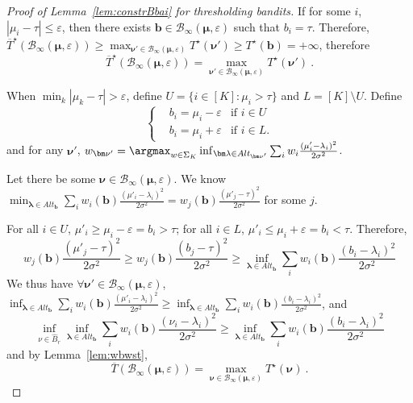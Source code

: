 \begin{proof}[Proof of Lemma~\ref{lem:constrBbai} for thresholding bandits]
	If for some $i$, $|\mu_i -\tau|\leq \varepsilon$, then there exists $\bm b\in \mathcal{B}_\infty(\bm\mu,\varepsilon)$ such that $b_i = \tau$. Therefore, $\overline{T}^\star(\mathcal{B}_\infty(\bm\mu,\varepsilon)) \geq \max_{\bm\nu'\in \mathcal{B}_\infty(\bm\mu,\varepsilon)} T^\star(\bm\nu')\geq T^\star(\bm b) =+\infty$, therefore \[\overline{T}^\star(\mathcal{B}_\infty(\bm\mu,\varepsilon)) = \max_{\bm\nu'\in \mathcal{B}_\infty(\bm\mu,\varepsilon)}T^\star(\bm\nu') \: .\]
	
	When $\min_k |\mu_k-\tau|>\varepsilon$, define $U=\{i\in[K]:\mu_i >\tau\}$ and $L=[K]\setminus U$. Define \[\left\{ \begin{aligned} &b_i= \mu_i-\varepsilon &\text{if }i\in U \\ &b_i =\mu_i +\varepsilon &\text{if }i\in L.\end{aligned}\right. \] and for any $\bm\nu'$, $w_{\bm\nu'} =\argmax_{w\in \Sigma_K} \inf_{\bm\lambda \in Alt_{\bm\nu'}} \sum_i w_i\frac{(\mu_i'-\lambda_i)^2}{2\sigma^2}$.
	
	
	
	
	Let there be some $\bm\nu\in \mathcal{B}_\infty(\bm\mu,\varepsilon)$.	We know $\min_{\bm\lambda \in Alt_{\bm b}} \sum_i w_i(\bm b)\frac{(\mu'_i-\lambda_i)^2}{2\sigma^2}=w_j(\bm b) \frac{(\mu'_j-\tau)^2}{2\sigma^2}$ for some $j$. 
	
	For all $i\in U$, $\mu'_i \geq \mu_i-\varepsilon = b_i>\tau$; for all $i\in L$, $\mu'_i \leq \mu_i+\varepsilon = b_i<\tau$. Therefore, \[w_j(\bm b) \frac{(\mu'_j-\tau)^2}{2\sigma^2}\geq w_j(\bm b) \frac{(b_j-\tau)^2}{2\sigma^2}\geq \inf_{\bm\lambda \in Alt_{\bm b}} \sum_i w_i(\bm b) \frac{(b_i-\lambda_i)^2}{2\sigma^2}\]
	We thus have $\forall \bm\nu' \in \mathcal{B}_\infty(\bm\mu,\varepsilon)$, $\inf_{\bm\lambda\in Alt_{\bm b}} \sum_i w_i(\bm b)\frac{(\mu'_i-\lambda_i)^2}{2\sigma^2} \geq \inf_{\bm\lambda \in Alt_{\bm b}} \sum_i w_i(\bm b) \frac{(b_i-\lambda_i)^2}{2\sigma^2}$, and \[\inf_{\nu\in\hat{B}_r}\inf_{\bm\lambda\in Alt_{\bm b}} \sum_i w_i(\bm b)\frac{(\nu_i-\lambda_i)^2}{2\sigma^2} \geq \inf_{\bm\lambda \in Alt_{\bm b}} \sum_i w_i(\bm b) \frac{(b_i-\lambda_i)^2}{2\sigma^2}\] and by Lemma~\ref{lem:wbwst},
\[\overline{T}(\mathcal B_{\infty}(\bm\mu, \varepsilon)) = \max_{\bm\nu\in \mathcal B_{\infty}(\bm\mu, \varepsilon)} T^\star(\bm\nu) \: .\]
\end{proof}
